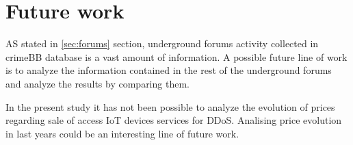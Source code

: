 \chapter{Future work}
\label{chapter:future}

AS stated in \ref{sec:forums} section, underground forums activity collected in crimeBB database is a vast amount of information. A possible future line of work is to analyze the information contained in the rest of the underground forums and analyze the results by comparing them.

In the present study it has not been possible to analyze the evolution of prices regarding sale of access IoT devices services for DDoS.  Analising price evolution in last years could be an interesting line of future work.
